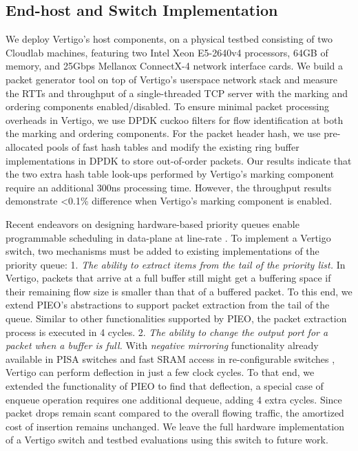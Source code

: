 \begin{figure}[t]
\begin{minipage}[b]{0.48\textwidth}
	\vspace{-5mm}
	\label{fig:ord}
\end{minipage}
\vspace{-2mm}
\end{figure}


\subsection{End-host and Switch Implementation}
\label{sec:vertigo-testbed}
We deploy Vertigo's host components, on a physical testbed consisting of two Cloudlab \cite{cloudlab} machines, featuring two Intel Xeon E5-2640v4 processors, 64GB of memory, and 25Gbps Mellanox ConnectX-4 network interface cards. We build
a packet generator tool on top of Vertigo's userspace network stack and measure
the RTTs and throughput of a single-threaded TCP server with the marking and ordering components enabled/disabled.
To ensure minimal packet processing overheads in Vertigo, we use DPDK cuckoo filters for flow identification at both the marking and ordering components. For the packet header hash, we use pre-allocated pools of fast hash tables and modify the existing ring buffer implementations in DPDK to store out-of-order packets.
Our results indicate that the two extra hash table look-ups performed by Vertigo's marking component require an additional 300ns processing time. However, the throughput results demonstrate <0.1\% difference when Vertigo's marking component is enabled.

Recent endeavors on designing hardware-based priority queues enable programmable scheduling in data-plane at line-rate \cite{pifo, pieo, calendar}. To implement a Vertigo switch, two mechanisms must be added to existing implementations of the priority queue: 1. \textit{The ability to extract items from the tail of the priority list.} In Vertigo, packets that arrive at a full buffer still might get a buffering space if their remaining flow size is smaller than that of a buffered packet. 
To this end, we extend PIEO's abstractions \cite{pieo} to support packet extraction from the tail of the queue. Similar to other functionalities supported by PIEO, the packet extraction process is executed in 4 cycles.
2. \textit{The ability to change the output port for a packet when a buffer is full.} With \textit{negative mirroring} functionality already available in PISA switches \cite{opentofino} and fast SRAM access in re-configurable switches \cite{pieo}, Vertigo can perform deflection in just a few clock cycles. To that end, we extended the functionality of PIEO \cite{pieo} to find that deflection, a special case of enqueue operation requires one additional dequeue, adding 4 extra cycles. Since packet drops remain scant compared to the overall flowing traffic, the amortized cost of insertion remains unchanged. We leave the full hardware implementation of a Vertigo switch and testbed evaluations using this switch to future work.

